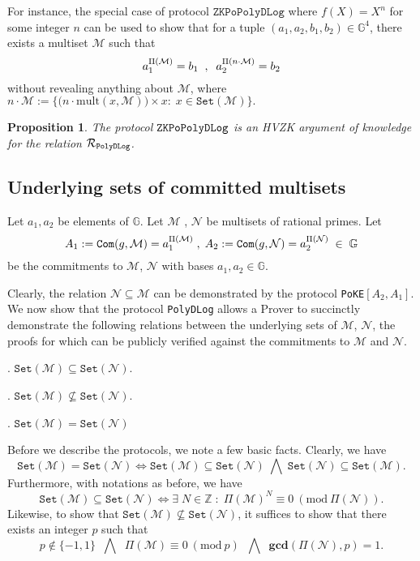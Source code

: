 \documentclass[11pt, lettersize, notitlepage, leqno, footskip=0.6cm]{article}
\newcommand{\bz}{\mathbb Z}
\newcommand{\ttt}{\texttt}
\newcommand{\bG}{\mathbb{G}}
\newcommand{\sett}{\ttt{Set}}
\newcommand{\mult}{\mr{mult}}
\newcommand{\LRA}{\Longleftrightarrow}
\newcommand{\mc}{\mathcal}
\newcommand{\mb}{\mathbb}
\newcommand{\mbf}{\mathbf}
\newcommand{\mr}{\mathrm}
\newcommand{\sub}{\subseteq}
\newcommand{\nsub}{\nsubseteq}
\newcommand{\mcM}{\mc{M}}
\newcommand{\vs}{\vspace{-0.15cm}}
\newcommand{\noin}{\noindent}
\newcommand{\Mod}[1]{\ (\mathrm{mod}\ #1)}
\newcommand{\GCD}{\mbf{gcd}}
\newtheorem{Prop}[Thm]{Proposition}
\numberwithin{equation}{section}
\begin{document}
For instance, the special case of protocol $\ttt{ZKPoPolyDLog}$ where $f(X) = X^n$ for some integer $n$ can be used to show that for a tuple $(a_1, a_2, b_1, b_2)\in \mb{G}^4$, there exists a multiset $\mcM$ such that \vs $$ a_1^{\Pi(\mcM)} = b_1\;\;,\;\; a_2^{\Pi(n\cdot\mcM)} = b_2   \vs $$ without revealing anything about $\mcM$, where $n\cdot\mcM:= \big\{\big(n\cdot \mult(x, \mcM)\big)\times x:\; x\in \sett({\mcM})\big\}.$


\begin{Prop} The protocol $\tt{ZKPoPolyDLog}$ is an HVZK argument of knowledge for the relation $\mc{R}_{\tt{PolyDLog}}$.\end{Prop}

\begin{prf} \end{prf}






\subsection{\fontsize{11}{11}\selectfont Underlying sets of committed multisets}

\noin \hypertarget{Sets}{Let $a_1,a_2$ be elements of $\mb{G}$. Let $\mc{M}$ , $\mc{N}$ be multisets of rational primes.} Let \vs $$A_1:= \ttt{Com}(g, \mc{M}) =  a_1^{\Pi(\mc{M})}\;,\; A_2:= \ttt{Com}(g, \mc{N}) = a_2^{\Pi(\mc{N})}\;\in\;\bG \vs $$ be the commitments to $\mc{M}$, $\mc{N}$ with bases $a_1, a_2\in \bG$.

Clearly, the relation $\mc{N}\sub \mc{M}$ can be demonstrated by the protocol \verb|PoKE|$[A_2, A_1]$. We now show that the protocol \verb|PolyDLog| allows a Prover to succinctly demonstrate the following relations between the underlying sets of $\mc{M}$, $\mc{N}$, the proofs for which can be publicly verified against the commitments to $\mc{M}$ and $\mc{N}$.\vspace{0.1cm}

\noin 1. $\sett(\mc{M})\sub \sett(\mc{N})$.

\noin 2. $\sett(\mc{M})\nsub \sett(\mc{N})$.

\noin 3. $\sett(\mc{M}) = \sett(\mc{N})$ \vspace{0.1cm}

\noin Before we describe the protocols, we note a few basic facts. Clearly, we have \vs $$\sett(\mc{M}) = \sett(\mc{N})\LRA \sett(\mc{M}) \sub \sett(\mc{N})\;\bigwedge\; \sett(\mc{N}) \sub \sett(\mc{M}).$$ Furthermore, with notations as before, we have \vs $$\sett(\mc{M})\sub \sett(\mc{N})\LRA \exists\; N\in\bz\;:\;\Pi(\mc{M})^N\equiv 0\Mod{\Pi(\mc{N})}.$$ Likewise, to show that $\sett(\mc{M})\nsub \sett(\mc{N})$, it suffices to show that there exists an integer $p$ such that \vs $$p\notin \{-1,1\}   \;\;\bigwedge\;\;\Pi(\mc{M})\equiv 0\Mod{p} \;\;\bigwedge\;\; \GCD(\Pi(\mc{N}),{p})=1.$$
\end{document}
